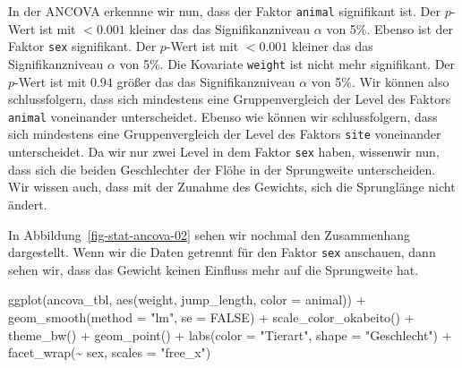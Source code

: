 \documentclass[
  letterpaper,
]{scrbook}
\newenvironment{Shaded}{\begin{snugshade}}{\end{snugshade}}
\newcommand{\AttributeTok}[1]{\textcolor[rgb]{0.40,0.45,0.13}{#1}}
\newcommand{\ConstantTok}[1]{\textcolor[rgb]{0.56,0.35,0.01}{#1}}
\newcommand{\FunctionTok}[1]{\textcolor[rgb]{0.28,0.35,0.67}{#1}}
\newcommand{\NormalTok}[1]{\textcolor[rgb]{0.00,0.23,0.31}{#1}}
\newcommand{\SpecialCharTok}[1]{\textcolor[rgb]{0.37,0.37,0.37}{#1}}
\newcommand{\StringTok}[1]{\textcolor[rgb]{0.13,0.47,0.30}{#1}}
\begin{document}
In der ANCOVA erkennne wir nun, dass der Faktor \texttt{animal}
signifikant ist. Der \(p\)-Wert ist mit \(<0.001\) kleiner das das
Signifikanzniveau \(\alpha\) von 5\%. Ebenso ist der Faktor \texttt{sex}
signifikant. Der \(p\)-Wert ist mit \(<0.001\) kleiner das das
Signifikanzniveau \(\alpha\) von 5\%. Die Kovariate \texttt{weight} ist
nicht mehr signifikant. Der \(p\)-Wert ist mit \(0.94\) größer das das
Signifikanzniveau \(\alpha\) von 5\%. Wir können also schlussfolgern,
dass sich mindestens eine Gruppenvergleich der Level des Faktors
\texttt{animal} voneinander unterscheidet. Ebenso wie können wir
schlussfolgern, dass sich mindestens eine Gruppenvergleich der Level des
Faktors \texttt{site} voneinander unterscheidet. Da wir nur zwei Level
in dem Faktor \texttt{sex} haben, wissenwir nun, dass sich die beiden
Geschlechter der Flöhe in der Sprungweite unterscheiden. Wir wissen
auch, dass mit der Zunahme des Gewichts, sich die Sprunglänge nicht
ändert.

In Abbildung~\ref{fig-stat-ancova-02} sehen wir nochmal den Zusammenhang
dargestellt. Wenn wir die Daten getrennt für den Faktor \texttt{sex}
anschauen, dann sehen wir, dass das Gewicht keinen Einfluss mehr auf die
Sprungweite hat.

\begin{Shaded}
\begin{Highlighting}[]
\FunctionTok{ggplot}\NormalTok{(ancova\_tbl, }\FunctionTok{aes}\NormalTok{(weight, jump\_length, }\AttributeTok{color =}\NormalTok{ animal)) }\SpecialCharTok{+}
  \FunctionTok{geom\_smooth}\NormalTok{(}\AttributeTok{method =} \StringTok{"lm"}\NormalTok{, }\AttributeTok{se =} \ConstantTok{FALSE}\NormalTok{) }\SpecialCharTok{+}
  \FunctionTok{scale\_color\_okabeito}\NormalTok{() }\SpecialCharTok{+}
  \FunctionTok{theme\_bw}\NormalTok{() }\SpecialCharTok{+}
  \FunctionTok{geom\_point}\NormalTok{() }\SpecialCharTok{+}
  \FunctionTok{labs}\NormalTok{(}\AttributeTok{color  =} \StringTok{"Tierart"}\NormalTok{, }\AttributeTok{shape =} \StringTok{"Geschlecht"}\NormalTok{) }\SpecialCharTok{+}
  \FunctionTok{facet\_wrap}\NormalTok{(}\SpecialCharTok{\textasciitilde{}}\NormalTok{ sex, }\AttributeTok{scales =} \StringTok{"free\_x"}\NormalTok{)}
\end{Highlighting}
\end{Shaded}
\end{document}
